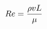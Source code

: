 \documentclass[preview]{standalone}
\begin{document}
\begin{align*}
Re = {\rho v L \over \mu}
\end{align*}
\end{document}
